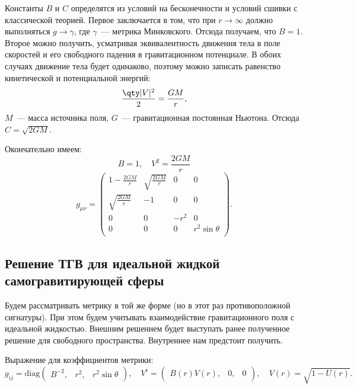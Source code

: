 \documentclass[\docroot/reports/draft/report.tex]{subfiles}
\begin{document}
    Константы $B$ и $C$ определятся из условий на бесконечности и условий сшивки с классической теорией. Первое заключается в том, что при $r \to \infty$ должно выполняться $g \to \gamma$, где $\gamma$~--- метрика Минковского. Отсюда получаем, что $B = 1$. Второе можно получить, усматривая эквивалентность движения тела в поле скоростей и его свободного падения в гравитационном потенциале. В обоих случаях движение тела будет одинаково, поэтому можно записать равенство кинетической и потенциальной энергий:
    \begin{equation*}
        \frac{\qty|V|^2}{2} = \frac{G M}{r} ,
    \end{equation*}
    $M$~--- масса источника поля, $G$~--- гравитационная постоянная Ньютона. Отсюда $C = \sqrt{2 G M}$.

    Окончательно имеем:
    \begin{equation*}
        B = 1, \quad V^2 = \frac{2 G M}{r}
    \end{equation*}
    \begin{equation*}
        g_{\mu\nu} = \begin{pmatrix}
            1 - \frac{2 G M}{r} & \sqrt{\frac{2 G M}{r}} & 0 & 0 \\
            \sqrt{\frac{2 G M}{r}} & -1 & 0 & 0 \\
            0 & 0 & -r^2 & 0 \\
            0 & 0 & 0 & r^2 \sin\theta \\
        \end{pmatrix} .
    \end{equation*}

\subsection{Решение ТГВ для идеальной жидкой самогравитирующей сферы}

    Будем рассматривать метрику в той же форме (но в этот раз противоположной сигнатуры). При этом будем учитывать взаимодействие гравитационного поля с идеальной жидкостью. Внешним решением будет выступать ранее полученное решение для свободного пространства. Внутреннее нам предстоит получить.

    Выражение для коэффициентов метрики:
    \begin{equation*}
        g_{ij} = \text{diag} \begin{pmatrix}B^{-2}, & r^2, & r^2 \sin\theta\end{pmatrix} , \quad
        V^i = \begin{pmatrix}B(r)V(r), & 0, & 0\end{pmatrix} , \quad
        V(r) = \sqrt{1 - U(r)} .
    \end{equation*}
\end{document}
